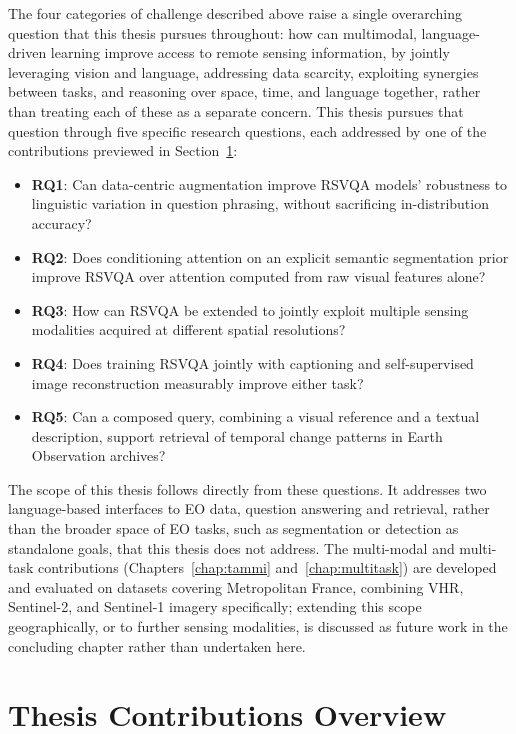 The four categories of challenge described above raise a single overarching question that this thesis pursues throughout: how can multimodal, language-driven learning improve access to remote sensing information, by jointly leveraging vision and language, addressing data scarcity, exploiting synergies between tasks, and reasoning over space, time, and language together, rather than treating each of these as a separate concern. This thesis pursues that question through five specific research questions, each addressed by one of the contributions previewed in Section~\ref{sec:intro_contributions_overview}:
 
\begin{itemize}
\item \textbf{RQ1}: Can data-centric augmentation improve RSVQA models' robustness to linguistic variation in question phrasing, without sacrificing in-distribution accuracy?
\item \textbf{RQ2}: Does conditioning attention on an explicit semantic segmentation prior improve RSVQA over attention computed from raw visual features alone?
\item \textbf{RQ3}: How can RSVQA be extended to jointly exploit multiple sensing modalities acquired at different spatial resolutions?
\item \textbf{RQ4}: Does training RSVQA jointly with captioning and self-supervised image reconstruction measurably improve either task?
\item \textbf{RQ5}: Can a composed query, combining a visual reference and a textual description, support retrieval of temporal change patterns in Earth Observation archives?
\end{itemize}
 
The scope of this thesis follows directly from these questions. It addresses two language-based interfaces to EO data, question answering and retrieval, rather than the broader space of EO tasks, such as segmentation or detection as standalone goals, that this thesis does not address. The multi-modal and multi-task contributions (Chapters~\ref{chap:tammi} and~\ref{chap:multitask}) are developed and evaluated on datasets covering Metropolitan France, combining VHR, Sentinel-2, and Sentinel-1 imagery specifically; extending this scope geographically, or to further sensing modalities, is discussed as future work in the concluding chapter rather than undertaken here. 
\section{Thesis Contributions Overview}
\label{sec:intro_contributions_overview}
 
